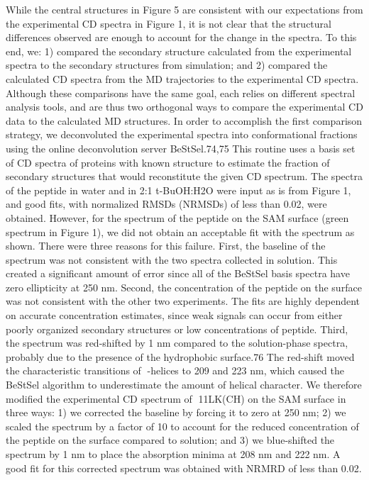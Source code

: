 While the central structures in Figure 5 are consistent with our expectations from the experimental CD spectra in Figure 1, it is not clear that the structural differences observed are enough to account for the change in the spectra. To this end, we: 1) compared the secondary structure calculated from the experimental spectra to the secondary structures from simulation; and 2) compared the calculated CD spectra from the MD trajectories to the experimental CD spectra. Although these comparisons have the same goal, each relies on different spectral analysis tools, and are thus two orthogonal ways to compare the experimental CD data to the calculated MD structures. In order to accomplish the first comparison strategy, we deconvoluted the experimental spectra into conformational fractions using the online deconvolution server BeStSel.74,75 This routine uses a basis set of CD spectra of proteins with known structure to estimate the fraction of secondary structures that would reconstitute the given CD spectrum. The spectra of the peptide in water and in 2:1 t-BuOH:H2O were input as is from Figure 1, and good fits, with normalized RMSDs (NRMSDs) of less than 0.02, were obtained. However, for the spectrum of the peptide on the SAM surface (green spectrum in Figure 1), we did not obtain an acceptable fit with the spectrum as shown. There were three reasons for this failure. First, the baseline of the spectrum was not consistent with the two spectra collected in solution. This created a significant amount of error since all of the BeStSel basis spectra have zero ellipticity at 250 nm. Second, the concentration of the peptide on the surface was not consistent with the other two experiments. The fits are highly dependent on accurate concentration estimates, since weak signals can occur from either poorly organized secondary structures or low concentrations of peptide. Third, the spectrum was red-shifted by 1 nm compared to the solution-phase spectra, probably due to the presence of the hydrophobic surface.76 The red-shift moved the characteristic transitions of -helices to 209 and 223 nm, which caused the BeStSel algorithm to underestimate the amount of helical character. We therefore modified the experimental CD spectrum of 11LK(CH) on the SAM surface in three ways: 1) we corrected the baseline by forcing it to zero at 250 nm; 2) we scaled the spectrum by a factor of 10 to account for the reduced concentration of the peptide on the surface compared to solution; and 3) we blue-shifted the spectrum by 1 nm to place the absorption minima at 208 nm and 222 nm. A good fit for this corrected spectrum was obtained with NRMRD of less than 0.02.
